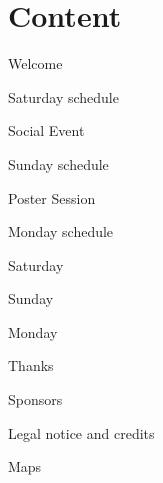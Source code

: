 \section*{Content}
\newlength\contentspace
\setlength\contentspace{0pt}

\vspace*{\contentspace}%
\noindent Welcome\dotfill \pageref{welcome}
%
%
%

\vspace*{\contentspace}%
\noindent Saturday schedule \dotfill \pageref{saturday}

\vspace*{\contentspace}%
\noindent Social Event \dotfill \pageref{social-event}

\vspace*{\contentspace}%
\noindent Sunday schedule \dotfill \pageref{sunday}

\vspace*{\contentspace}%
\noindent Poster Session \dotfill \pageref{poster-event}

\vspace*{\contentspace}%
\noindent Monday schedule \dotfill \pageref{monday}

\vspace*{\contentspace}%
\noindent Saturday \dotfill \pageref{saturday-descriptions}

\vspace*{\contentspace}%
\noindent Sunday \dotfill \pageref{sunday-descriptions}

\vspace*{\contentspace}%
\noindent Monday \dotfill \pageref{monday-descriptions}

\vspace*{\contentspace}%
\noindent Thanks \dotfill \pageref{thanks}

\vspace*{\contentspace}%
\noindent Sponsors \dotfill \pageref{sponsors}

\vspace*{\contentspace}%
\noindent Legal notice and credits \dotfill \pageref{legal}

\vspace*{\contentspace}%
\noindent Maps \dotfill \pageref{public-transport-map}

